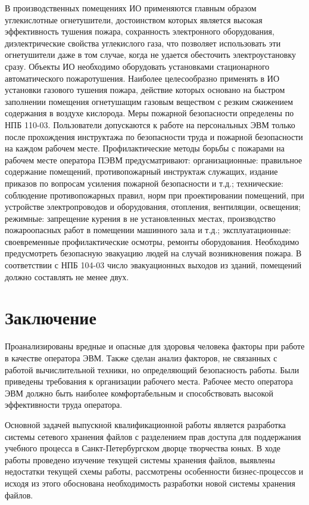\documentclass[utf8,usehyperref,12pt]{G7-32}
\begin{document}
В производственных помещениях ИО применяются главным образом углекислотные огнетушители, достоинством которых является высокая эффективность тушения пожара, сохранность электронного оборудования, диэлектрические свойства углекислого газа, что позволяет использовать эти огнетушители даже в том случае, когда не удается обесточить электроустановку сразу. 
Объекты ИО необходимо оборудовать установками стационарного автоматического пожаротушения. Наиболее целесообразно применять в ИО установки газового тушения пожара, действие которых основано на быстром заполнении помещения огнетушащим газовым веществом с резким сжижением содержания в воздухе кислорода.
Меры пожарной безопасности определены по НПБ 110-03. Пользователи допускаются к работе на персональных ЭВМ только после прохождения инструктажа по безопасности труда и пожарной безопасности на каждом рабочем месте.
Профилактические методы борьбы с пожарами на рабочем месте оператора ПЭВМ предусматривают:
организационные: правильное содержание помещений, противопожарный инструктаж служащих, издание приказов по вопросам усиления пожарной безопасности 
и т.д.;
технические: соблюдение противопожарных правил, норм при проектировании помещений, при устройстве электропроводов и оборудования, отопления, вентиляции, освещения;
режимные: запрещение курения в не установленных местах, производство пожароопасных работ в помещении машинного зала и т.д.;
эксплуатационные: своевременные профилактические осмотры, ремонты оборудования.
Необходимо предусмотреть безопасную эвакуацию людей на случай возникновения пожара. В соответствии с НПБ 104-03 число эвакуационных выходов из зданий, помещений должно составлять не менее двух.

\section{Заключение}
Проанализированы вредные и опасные для здоровья человека факторы при работе в качестве оператора ЭВМ. Также сделан анализ факторов, не связанных с работой вычислительной техники, но определяющий безопасность работы. Были приведены требования к организации рабочего места. Рабочее место оператора ЭВМ должно быть наиболее комфортабельным и способствовать высокой эффективности труда оператора.


\Conclusion

Основной задачей выпускной квалификационной работы является разработка системы сетевого хранения файлов с разделением прав доступа для поддержания учебного процесса в Санкт-Петербургском дворце творчества юных. В ходе работы проведено изучение текущей системы хранения файлов, выявлены недостатки текущей схемы работы, рассмотрены особенности бизнес-процессов и исходя из этого обоснована необходимость разработки новой системы хранения файлов. 
\end{document}
